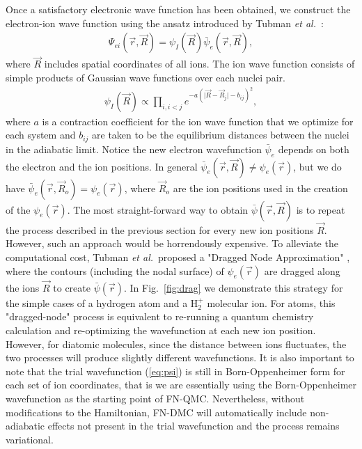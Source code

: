 \documentclass[pra,superscriptaddress,groupedaddress,twocolumn]{revtex4}
\begin{document}
Once a satisfactory electronic wave function has been obtained, we construct the electron-ion wave function using the ansatz introduced by Tubman {\it et al.}~\cite{Tubman_ECG}:
\begin{align}
\Psi_{ei}(\vec{r},\vec{R})=\psi_I(\vec{R})\bar{\psi}_e(\vec{r},\vec{R}), \label{eq:psi}
\end{align}
where $\vec{R}$ includes spatial coordinates of all ions. The ion wave function consists of simple products of Gaussian wave functions over each nuclei pair.
\begin{align}
\psi_I(\vec{R})\propto \prod\limits_{i,i<j}e^{-a(\vert \vec{R}-\vec{R}_j\vert-b_{ij})^2},
\label{wfs_ions}
\end{align}
where $a$ is a contraction coefficient for the ion wave function that we optimize for each system and $b_{ij}$ are taken to be the equilibrium distances between the nuclei in the adiabatic limit. Notice the new electron wavefunction $\bar{\psi}_e$ depends on both the electron and the ion positions. In general $\bar{\psi}_e(\vec{r},\vec{R})\neq\psi_e(\vec{r})$, but we do have $\bar{\psi}_e(\vec{r},\vec{R}_o)=\psi_e(\vec{r})$, where $\vec{R}_o$ are the ion positions used in the creation of the $\psi_e(\vec{r})$. The most straight-forward way to obtain $\bar{\psi}(\vec{r},\vec{R})$ is to repeat the process described in the previous section for every new ion positions $\vec{R}$. However, such an approach would be horrendously expensive. To alleviate the computational cost, Tubman {\it et al.}~proposed a "Dragged Node Approximation" \cite{Tubman_ECG}, where the contours (including the nodal surface) of $\psi_e(\vec{r})$ are dragged along the ions $\vec{R}$ to create $\bar{\psi}(\vec{r})$. In Fig.~\ref{fig:drag} we demonstrate this strategy for the simple cases of a hydrogen atom and a H$_2^+$ molecular ion. For atoms, this "dragged-node" process is equivalent to re-running a quantum chemistry calculation and re-optimizing the wavefunction at each new ion position. However, for diatomic molecules, since the distance between ions fluctuates, the two processes will produce slightly different wavefunctions. It is also important to note that the trial wavefunction (\ref{eq:psi}) is still in Born-Oppenheimer form for each set of ion coordinates, that is we are essentially using the Born-Oppenheimer wavefunction as the starting point of FN-QMC. Nevertheless, without modifications to the Hamiltonian, FN-DMC will automatically include non-adiabatic effects not present in the trial wavefunction and the process remains variational.
\end{document}
